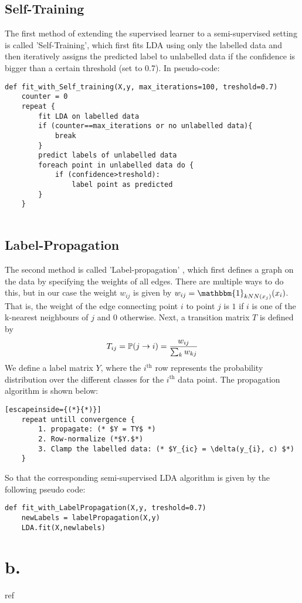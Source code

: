 \documentclass [a4paper] {report}
\begin{document}
	\subsection*{Self-Training}
	The first method of extending the supervised learner to a semi-supervised setting is called 'Self-Training', which first fits LDA using only the labelled data and then iteratively assigns the predicted label to unlabelled data if the confidence is bigger than a certain threshold (set to 0.7). In pseudo-code:
	
	\begin{lstlisting}
def fit_with_Self_training(X,y, max_iterations=100, treshold=0.7)
	counter = 0
	repeat {
		fit LDA on labelled data
		if (counter==max_iterations or no unlabelled data){
			break
		}
		predict labels of unlabelled data
		foreach point in unlabelled data do {
			if (confidence>treshold):
				label point as predicted
		}		
	}
	
	\end{lstlisting}
	\subsection*{Label-Propagation}
	The second method is called 'Label-propagation' \citep{propagation}, which first defines a graph on the data by specifying the weights of all edges. There are multiple ways to do this, but in our case the weight $w_{ij}$ is given by $w_{ij} = \mathbbm{1}_{kNN(x_{j})}(x_{i})$. That is, the weight of the edge connecting point $i$ to point $j$ is $1$ if $i$ is one of the k-nearest neighbours of $j$ and $0$ otherwise. Next, a transition matrix $T$ is defined by 
	$$T_{ij} = \mathbb{P}(j \to i) = {w_{ij} \over \sum_{k} w_{kj} } $$
	We define a label matrix $Y$, where the $i^{\text{th}}$ row represents the probability distribution over the different classes for the $i^{\text{th}}$ data point. The propagation algorithm is shown below:
	\begin{lstlisting}[escapeinside={(*}{*)}]
	repeat untill convergence {
		1. propagate: (* $Y = TY$ *)
		2. Row-normalize (*$Y.$*)
		3. Clamp the labelled data: (* $Y_{ic} = \delta(y_{i}, c) $*)	
	}
	\end{lstlisting}
	So that the corresponding semi-supervised LDA algorithm is given by the following pseudo code:
	\begin{lstlisting}
def fit_with_LabelPropagation(X,y, treshold=0.7)
	newLabels = labelPropagation(X,y)
	LDA.fit(X,newlabels)
	\end{lstlisting}
	
	\section*{b.}
	
	
	
	 
	
	\begin{bibliography}{ref}
		
	\end{bibliography}
\end{document}
